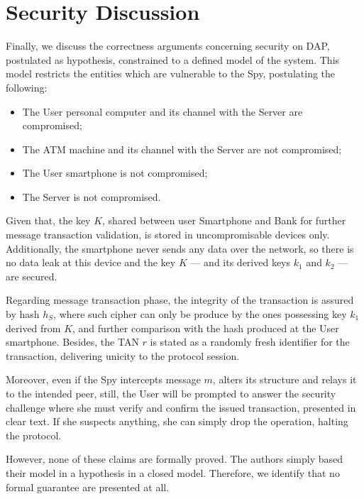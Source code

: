 \section{Security Discussion}
Finally, we discuss the correctness arguments concerning security on DAP, postulated as hypothesis, constrained to a defined model of the system. This model restricts the entities which are vulnerable to the Spy, postulating the following:

\begin{itemize}
  \item The User personal computer and its channel with the Server are compromised;
  \item The ATM machine and its channel with the Server are not compromised;
  \item The User smartphone is not compromised;
  \item The Server is not compromised.
\end{itemize}

Given that, the key \(K\), shared between user Smartphone and Bank for further message transaction validation, is stored in uncompromisable devices only. Additionally, the smartphone never sends any data over the network, so there is no data leak at this device and the key \(K\) --- and its derived keys \(k_1\) and \(k_2\) --- are secured.

Regarding message transaction phase, the integrity of the transaction is assured by hash \(h_S\), where such cipher can only be produce by the ones possessing key \(k_1\) derived from \(K\), and further comparison with the hash produced at the User smartphone. Besides, the TAN \(r\) is stated as a randomly fresh identifier for the transaction, delivering unicity to the protocol session.

Moreover, even if the Spy intercepts message \(m\), alters its structure and relays it to the intended peer, still, the User will be prompted to answer the security challenge where she must verify and confirm the issued transaction, presented in clear text. If she suspects anything, she can simply drop the operation, halting the protocol.

However, none of these claims are formally proved. The authors simply based their model in a hypothesis in a closed model. Therefore, we identify that no formal guarantee are presented at all.
